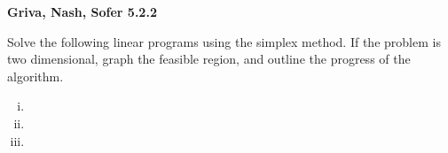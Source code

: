 \textbf{Griva, Nash, Sofer 5.2.2}

Solve the following linear programs using the simplex method. If the problem is two dimensional,
graph the feasible region, and outline the progress of the algorithm.

\begin{enumerate}[(i)]
  \item 
  \pagebreak
  \item 
  \pagebreak
  \setcounter{enumii}{4}
  \item 
\end{enumerate}
